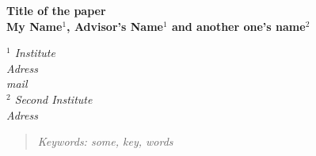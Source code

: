 {
    \begin{center}
		\textbf{\large{ Title of the paper}}
		\\[4mm]
		\textbf{My Name$^1$, Advisor's Name$^1$ and another one's name$^2$}
		\\[1ex]
		\tcr{\today}
	\end{center}

	\begin{center}
		\textit{$^1$ Institute\\ Adress\\
			mail\\
			$^2$ Second Institute\\ Adress}
	\end{center}

	\begin{abstract}
		\tcb{---}

		\textit{Keywords: some, key, words}\\
	\end{abstract}

}